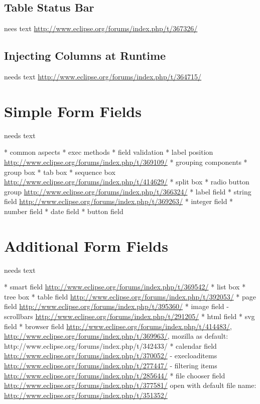 \documentclass[a4paper,10pt,twoside]{book}
\begin{document}
\subsection{Table Status Bar}
nees text
\url{http://www.eclipse.org/forums/index.php/t/367326/}

\subsection{Injecting Columns at Runtime}
needs text
\url{http://www.eclipse.org/forums/index.php/t/364715/}

\section{Simple Form Fields}
needs text

    * common aspects
	  * exec methods
	  * field validation
	  * label position \url{http://www.eclipse.org/forums/index.php/t/369109/}
	* grouping components
	  * group box
	  * tab box
	  * sequence box \url{http://www.eclipse.org/forums/index.php/t/414629/}
	  * split box
      * radio button group \url{http://www.eclipse.org/forums/index.php/t/366324/}
	* label field
	* string field \url{http://www.eclipse.org/forums/index.php/t/369263/}
	* integer field
	* number field
	* date field
	* button field

\section{Additional Form Fields}
needs text

	* smart field \url{http://www.eclipse.org/forums/index.php/t/369542/}
	* list box
	* tree box
	* table field \url{http://www.eclipse.org/forums/index.php/t/392053/}
	* page field \url{http://www.eclipse.org/forums/index.php/t/395360/}
	* image field 
	  - scrollbars \url{http://www.eclipse.org/forums/index.php/t/291205/}
	* html field
	* svg field
	* browser field \url{http://www.eclipse.org/forums/index.php/t/414483/}, 
	\url{http://www.eclipse.org/forums/index.php/t/369963/}, mozilla as default: http://www.eclipse.org/forums/index.php/t/342433/
	* calendar field \url{http://www.eclipse.org/forums/index.php/t/370052/}
	  - execloaditems \url{http://www.eclipse.org/forums/index.php/t/277447/}
	  - filtering items \url{http://www.eclipse.org/forums/index.php/t/285644/}
	* file chooser field \url{http://www.eclipse.org/forums/index.php/t/377581/}
	  open with default file name: \url{http://www.eclipse.org/forums/index.php/t/351352/}
  
\end{document}

